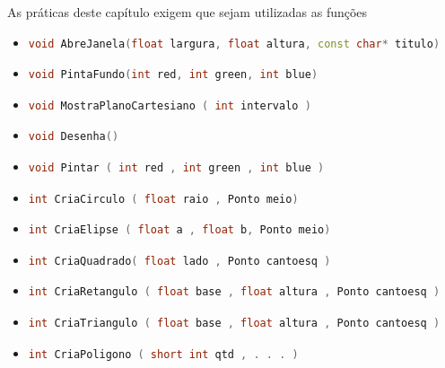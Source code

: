 As práticas deste capítulo exigem que sejam utilizadas as funções
\begin{itemize}
  \item 
    \begin{lstlisting}[language=C++]
    void AbreJanela(float largura, float altura, const char* titulo)
    \end{lstlisting}

  \item
    \begin{lstlisting}[language=C++]
    void PintaFundo(int red, int green, int blue)
    \end{lstlisting}

  \item
    \begin{lstlisting}[language=C++]
    void MostraPlanoCartesiano ( int intervalo )
    \end{lstlisting}

  \item
    \begin{lstlisting}[language=C++]
    void Desenha()
    \end{lstlisting}

  \item
    \begin{lstlisting}[language=C++]
    void Pintar ( int red , int green , int blue )
    \end{lstlisting}

  \item
    \begin{lstlisting}[language=C++]
    int CriaCirculo ( float raio , Ponto meio)
    \end{lstlisting}

    \item
    \begin{lstlisting}[language=C++]
    int CriaElipse ( float a , float b, Ponto meio)
    \end{lstlisting}

    \item
    \begin{lstlisting}[language=C++]
    int CriaQuadrado( float lado , Ponto cantoesq )
    \end{lstlisting}

    \item
    \begin{lstlisting}[language=C++]
    int CriaRetangulo ( float base , float altura , Ponto cantoesq )
    \end{lstlisting}

    \item
    \begin{lstlisting}[language=C++]
    int CriaTriangulo ( float base , float altura , Ponto cantoesq )
    \end{lstlisting}

    \item
    \begin{lstlisting}[language=C++]
    int CriaPoligono ( short int qtd , . . . )
    \end{lstlisting}
\end{itemize}

